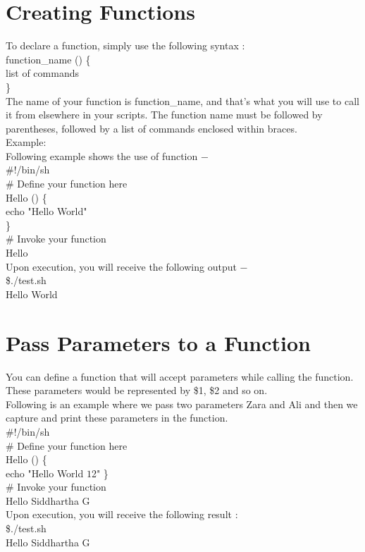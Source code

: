 \documentclass{article}
\begin{document}
\section*{Creating Functions}
To declare a function, simply use the following syntax :\\
function\_name () \{\\ 
   list of commands\\
\}\\
The name of your function is function\_name, and that's what you will use to call it from elsewhere in your scripts. The function name must be followed by parentheses, followed by a list of commands enclosed within braces.\\
Example:\\
Following example shows the use of function −\\
\#!/bin/sh\\
\# Define your function here\\
Hello () \{\\
   echo "Hello World"\\
\}\\
\# Invoke your function\\
Hello\\
Upon execution, you will receive the following output −\\
\$./test.sh\\
Hello World\\

\section*{Pass Parameters to a Function}
You can define a function that will accept parameters while calling the function. These parameters would be represented by \$1, \$2 and so on.\\
Following is an example where we pass two parameters Zara and Ali and then we capture and print these parameters in the function.\\
\#!/bin/sh\\
\# Define your function here\\
Hello () \{\\
   echo "Hello World $1 $2"
\}\\
\# Invoke your function\\
Hello Siddhartha G\\
Upon execution, you will receive the following result :\\
\$./test.sh\\
Hello Siddhartha G\\
\end{document}
